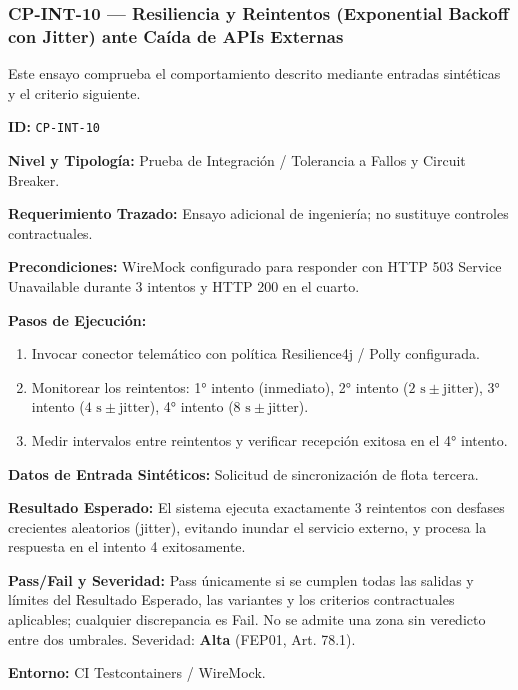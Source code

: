 \subsubsection*{CP-INT-10 — Resiliencia y Reintentos (Exponential Backoff con Jitter) ante Caída de APIs Externas}\label{sec:9-cp-int-10}
Este ensayo comprueba el comportamiento descrito mediante entradas sintéticas y el criterio siguiente.

\par\noindent\textbf{ID:} \texttt{C\allowbreak{}P\allowbreak{}-\allowbreak{}I\allowbreak{}N\allowbreak{}T\allowbreak{}-\allowbreak{}1\allowbreak{}0\allowbreak{}}\par
\par\noindent\textbf{Nivel y Tipología:} Prueba de Integración / Tolerancia a Fallos y Circuit Breaker.\par
\par\noindent\textbf{Requerimiento Trazado:} Ensayo adicional de ingeniería; no sustituye controles contractuales.\par
\par\noindent\textbf{Precondiciones:} WireMock configurado para responder con HTTP 503 Service Unavailable durante 3 intentos y HTTP 200 en el cuarto.\par
\par\noindent\textbf{Pasos de Ejecución:} \par
\begin{enumerate}
\item Invocar conector telemático con política Resilience4j / Polly configurada.
\item Monitorear los reintentos: 1° intento (inmediato), 2° intento (\(2\text{ s} \pm \text{jitter}\)), 3° intento (\(4\text{ s} \pm \text{jitter}\)), 4° intento (\(8\text{ s} \pm \text{jitter}\)).
\item Medir intervalos entre reintentos y verificar recepción exitosa en el 4° intento.
\end{enumerate}
\par\noindent\textbf{Datos de Entrada Sintéticos:} Solicitud de sincronización de flota tercera.\par
\par\noindent\textbf{Resultado Esperado:} El sistema ejecuta exactamente 3 reintentos con desfases crecientes aleatorios (jitter), evitando inundar el servicio externo, y procesa la respuesta en el intento 4 exitosamente.\par
\par\noindent\textbf{Pass/Fail y Severidad:} Pass únicamente si se cumplen todas las salidas y límites del Resultado Esperado, las variantes y los criterios contractuales aplicables; cualquier discrepancia es Fail. No se admite una zona sin veredicto entre dos umbrales. Severidad: \textbf{Alta} (FEP01, Art. 78.1).\par
\par\noindent\textbf{Entorno:} CI Testcontainers / WireMock.\par






